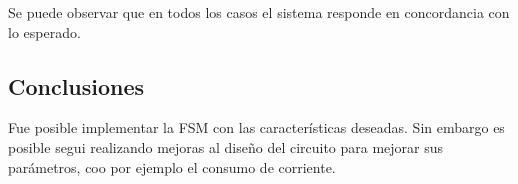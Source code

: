 Se puede observar que en todos los casos el sistema responde en concordancia con lo esperado.

\subsection{Conclusiones}
Fue posible implementar la FSM con las caracter\'isticas deseadas. Sin embargo es posible segui realizando mejoras al dise\~no del circuito para mejorar sus par\'ametros, coo por ejemplo el consumo de corriente.